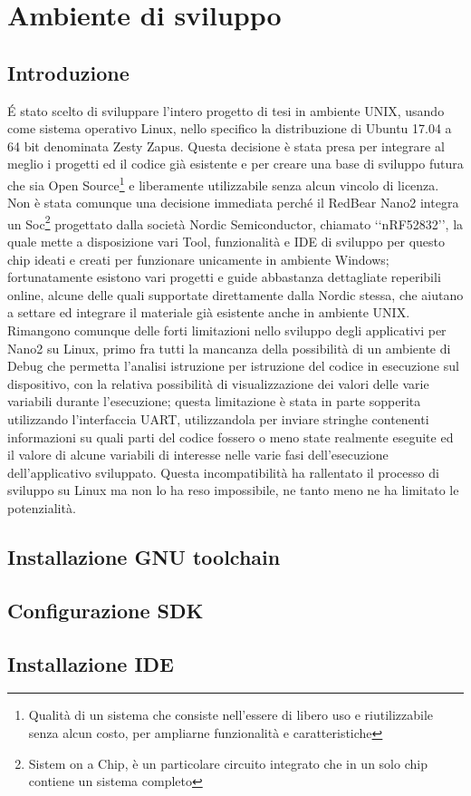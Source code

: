 
\section{Ambiente di sviluppo}
\subsection{Introduzione}
\'E stato scelto di sviluppare l'intero progetto di tesi in ambiente UNIX, usando come sistema operativo Linux, nello specifico la distribuzione di Ubuntu 17.04 a 64 bit denominata Zesty Zapus. Questa decisione è stata presa per integrare al meglio i progetti ed il codice già esistente e per creare una base di sviluppo futura che sia Open Source\footnote{Qualità di un sistema che consiste nell'essere di libero uso e riutilizzabile senza alcun costo, per ampliarne funzionalità e caratteristiche} e liberamente utilizzabile senza alcun vincolo di licenza. Non è stata comunque una decisione immediata perché il RedBear Nano2 integra un Soc\footnote{Sistem on a Chip, è un particolare circuito integrato che in un solo chip contiene un sistema completo} progettato dalla società Nordic Semiconductor, chiamato \lq\lq nRF52832\rq\rq, la quale mette a disposizione vari Tool, funzionalità e IDE di sviluppo per questo chip ideati e creati  per funzionare unicamente in ambiente Windows; fortunatamente esistono vari progetti e guide abbastanza dettagliate reperibili online, alcune delle quali supportate direttamente dalla Nordic stessa, che aiutano a settare ed integrare il materiale già esistente anche in ambiente UNIX.
Rimangono comunque delle forti limitazioni nello sviluppo degli applicativi per Nano2 su Linux, primo fra tutti la mancanza della possibilità di un ambiente di Debug che permetta l'analisi istruzione per istruzione del codice in esecuzione sul dispositivo, con la relativa possibilità di visualizzazione dei valori delle varie variabili durante l'esecuzione; questa limitazione è stata in parte sopperita utilizzando l'interfaccia UART, utilizzandola per inviare stringhe contenenti informazioni su quali parti del codice fossero o meno state realmente eseguite ed il valore di alcune variabili di interesse nelle varie fasi dell'esecuzione dell'applicativo sviluppato. 
Questa incompatibilità ha rallentato il processo di sviluppo su Linux ma non lo ha reso impossibile, ne tanto meno ne ha limitato le potenzialità.

\subsection{Installazione GNU toolchain}

\subsection{Configurazione SDK}

\subsection{Installazione IDE}
